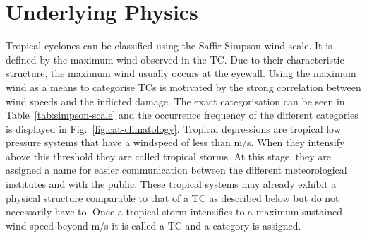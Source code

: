 \section{Underlying Physics}\label{sec:physics}
Tropical cyclones can be classified using the Saffir-Simpson wind scale. It is defined by the maximum wind observed in the TC. Due to their characteristic structure, the maximum wind usually occurs at the eyewall. Using the maximum wind as a means to categorise TCs is motivated by the strong correlation between wind speeds and the inflicted damage\cite{simpson}. The exact categorisation can be seen in Table~\ref{tab:simpson-scale} and the occurrence frequency of the different categories is displayed in Fig.~\ref{fig:cat-climatology}. Tropical depressions are tropical low pressure systems that have a windspeed of less than \unit[17]{m/s}. When they intensify above this threshold they are called tropical storms. At this stage, they are assigned a name for easier communication between the different meteorological institutes and with the public. These tropical systems may already exhibit a physical structure comparable to that of a TC as described below but do not necessarily have to. Once a tropical storm intensifies to a maximum sustained wind speed beyond \unit[33]{m/s} it is called a TC and a category is assigned.

